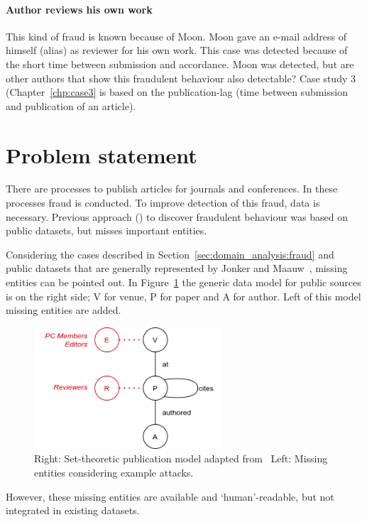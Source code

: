 \documentclass{ou-report}
\begin{document}
\paragraph{Author reviews his own work}
This kind of fraud is known because of Moon. Moon gave an e-mail address of 
himself (alias) as reviewer for his own work. This case was detected because of
the short time between submission and accordance. Moon was detected, but are 
other authors that show this fraudulent behaviour also detectable?
Case study 3 (Chapter~\ref{chp:case3} is based on the publication-lag (time 
between submission and publication of an article).

\section{Problem statement}
\label{sec:problem_statement}
There are processes to publish articles for journals and conferences.
In these processes fraud is conducted.
To improve detection of this fraud, data is necessary.
Previous approach (\cite{TEJ2017}) to discover fraudulent behaviour was based 
on public datasets, but misses important entities. 

Considering the cases described in Section~\ref{sec:domain_analysis:fraud} and 
public datasets that are generally represented by Jonker and Maauw~\cite{JM2017},
missing entities can be pointed out.
In Figure~\ref{fig:jm2017_missing_ent} the generic data model for public 
sources is on the right side; V for venue, P for paper and A for author. Left of 
this model missing entities are added.

\begin{figure}[H]
\centering
\includegraphics[width=7cm]{images/jm2017_miss_ent.png}
\caption{Right: Set-theoretic publication model adapted from~\cite{JM2017} Left: Missing entities considering example attacks.}
\label{fig:jm2017_missing_ent}
\end{figure}

However, these missing entities are available and `human'-readable, but not 
integrated in existing datasets.
\end{document}
